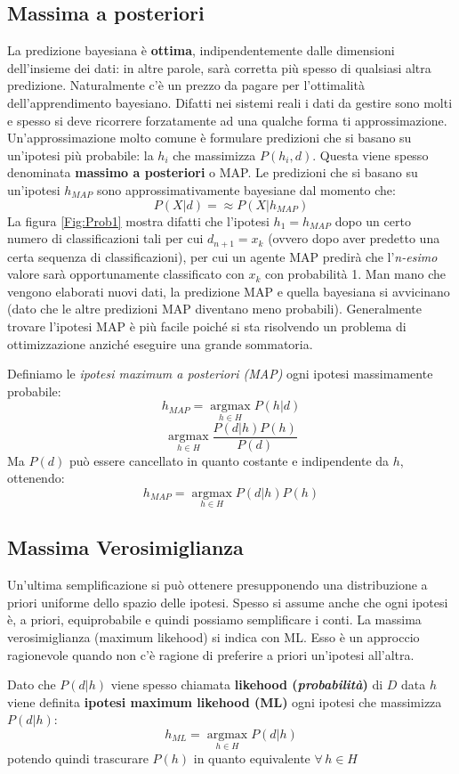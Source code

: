 \subsection{Massima a posteriori}
La predizione bayesiana è \textbf{ottima}, indipendentemente dalle dimensioni dell'insieme dei dati: in altre parole, sarà corretta più spesso di qualsiasi altra predizione. Naturalmente c'è un prezzo da pagare per l'ottimalità dell'apprendimento bayesiano. Difatti nei sistemi reali i dati da gestire sono molti e spesso si deve ricorrere forzatamente ad una qualche forma ti approssimazione. \\ 
Un'approssimazione molto comune è formulare predizioni che si basano su un'ipotesi più probabile: la $h_i$ che massimizza $P(h_i, d)$. Questa viene spesso denominata \textbf{massimo a posteriori} o MAP. Le predizioni che si basano su un'ipotesi $h_{MAP}$ sono approssimativamente bayesiane dal momento che:
\[P(X|d)= \approx P(X|h_{MAP})\]
La figura \ref{Fig:Prob1} mostra difatti che l'ipotesi $h_1 = h_{MAP}$ dopo un certo numero di classificazioni tali per cui $d_{n+1} = x_k$ (ovvero dopo aver predetto una certa sequenza di classificazioni), per cui un agente MAP predirà che l'\textit{n-esimo} valore sarà opportunamente classificato con $x_k$ con probabilità 1. 
Man mano che vengono elaborati nuovi dati, la predizione MAP e quella bayesiana si avvicinano (dato che le altre predizioni MAP diventano meno probabili). Generalmente trovare l'ipotesi MAP è più facile poiché si sta risolvendo un problema di ottimizzazione anziché eseguire una grande sommatoria.
\begin{definizione}
  Definiamo le \textit{ipotesi maximum a posteriori (MAP)} ogni ipotesi
  massimamente probabile:
  \[h_{MAP}=\operatorname*{argmax}_{h\in H}P(h|d)\]
  \[\operatorname*{argmax}_{h\in H}\frac{P(d|h)P(h)}{P(d)}\]
  Ma $P(d)$ può essere cancellato in quanto costante e indipendente da $h$,
  ottenendo:
  \[h_{MAP}=\operatorname*{argmax}_{h\in H}P(d|h)P(h)\]
\end{definizione}
\subsection{Massima Verosimiglianza}
Un'ultima semplificazione si può ottenere presupponendo una distribuzione a priori uniforme dello spazio delle ipotesi. Spesso si assume anche che ogni ipotesi è, a priori, equiprobabile e quindi possiamo semplificare i conti. La massima verosimiglianza (maximum likehood) si indica con ML. Esso è un approccio ragionevole quando non c'è ragione di preferire a priori un'ipotesi all'altra.
\begin{definizione}
  Dato che $P(d|h)$ viene spesso chiamata \textbf{likehood
    (\textit{probabilità})} di $D$ data $h$ viene definita \textbf{ipotesi
    maximum likehood (ML)} ogni ipotesi che massimizza $P(d|h)$:
  \[h_{ML}=\operatorname*{argmax}_{h\in H}P(d|h)\]
  potendo quindi trascurare $P(h)$ in quanto equivalente $\forall\, h\in H$
\end{definizione}
